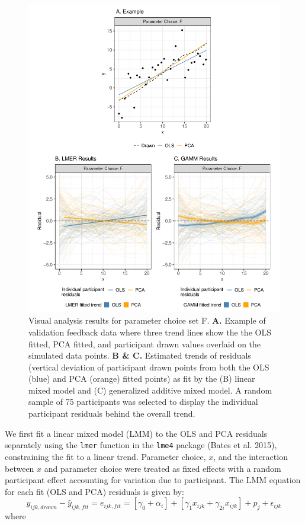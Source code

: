 \documentclass[
]{jds}
\begin{document}
\begin{figure}

{\centering \includegraphics{./images/fig-eyefitting-plots-1.pdf}

}

\caption{\label{fig-eyefitting-plots}Visual analysis results for
parameter choice set F. \linebreak \textbf{A.} Example of validation
feedback data where three trend lines show the the OLS fitted, PCA
fitted, and participant drawn values overlaid on the simulated data
points. \linebreak \textbf{B \& C.} Estimated trends of residuals
(vertical deviation of participant drawn points from both the OLS (blue)
and PCA (orange) fitted points) as fit by the (B) linear mixed model and
(C) generalized additive mixed model. A random sample of 75 participants
was selected to display the individual participant residuals behind the
overall trend.}

\end{figure}

We first fit a linear mixed model (LMM) to the OLS and PCA residuals
separately using the \texttt{lmer} function in the \texttt{lme4} package
(Bates et al. 2015), constraining the fit to a linear trend. Parameter
choice, \(x\), and the interaction between \(x\) and parameter choice
were treated as fixed effects with a random participant effect
accounting for variation due to participant. The LMM equation for each
fit (OLS and PCA) residuals is given by: \begin{equation}
y_{ijk,drawn} - \hat y_{ijk,fit} = e_{ijk,fit} = \left[\gamma_0 + \alpha_i\right] + \left[\gamma_{1} x_{ijk} + \gamma_{2i} x_{ijk}\right] + p_{j} + \epsilon_{ijk}
\end{equation} \noindent where
\end{document}
